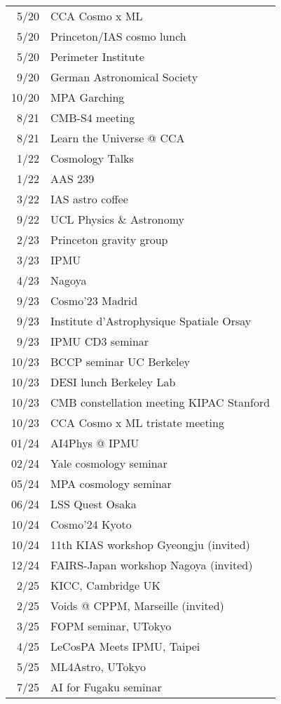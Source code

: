 \begin{tabular}{r l}
 5/20 & CCA Cosmo x ML \\
 5/20 & Princeton/IAS cosmo lunch \\
 5/20 & Perimeter Institute \\
 9/20 & German Astronomical Society \\
10/20 & MPA Garching \\
 8/21 & CMB-S4 meeting \\
 8/21 & Learn the Universe @ CCA \\
 1/22 & Cosmology Talks \\
 1/22 & AAS 239 \\
 3/22 & IAS astro coffee \\
 9/22 & UCL Physics \& Astronomy \\
 2/23 & Princeton gravity group \\
 3/23 & IPMU \\
 4/23 & Nagoya \\
 9/23 & Cosmo'23 Madrid \\
 9/23 & Institute d'Astrophysique Spatiale Orsay \\
 9/23 & IPMU CD3 seminar \\
10/23 & BCCP seminar UC Berkeley \\
10/23 & DESI lunch Berkeley Lab \\
10/23 & CMB constellation meeting KIPAC Stanford \\
10/23 & CCA Cosmo x ML tristate meeting \\
01/24 & AI4Phys @ IPMU \\
02/24 & Yale cosmology seminar \\
05/24 & MPA cosmology seminar \\
06/24 & LSS Quest Osaka \\
10/24 & Cosmo'24 Kyoto \\
10/24 & 11th KIAS workshop Gyeongju (invited) \\
12/24 & FAIRS-Japan workshop Nagoya (invited) \\
 2/25 & KICC, Cambridge UK \\
 2/25 & Voids @ CPPM, Marseille (invited) \\
 3/25 & FOPM seminar, UTokyo \\
 4/25 & LeCosPA Meets IPMU, Taipei \\
 5/25 & ML4Astro, UTokyo \\
 7/25 & AI for Fugaku seminar \\
\end{tabular}
